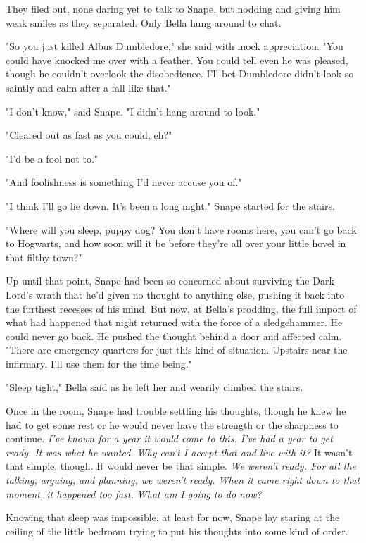 They filed out, none daring yet to talk to Snape, but nodding and giving him weak smiles as they separated. Only Bella hung around to chat.

"So you just killed Albus Dumbledore," she said with mock appreciation. "You could have knocked me over with a feather. You could tell even he was pleased, though he couldn't overlook the disobedience. I'll bet Dumbledore didn't look so saintly and calm after a fall like that."

"I don't know," said Snape. "I didn't hang around to look."

"Cleared out as fast as you could, eh?"

"I'd be a fool not to."

"And foolishness is something I'd never accuse you of."

"I think I'll go lie down. It's been a long night." Snape started for the stairs.

"Where will you sleep, puppy dog? You don't have rooms here, you can't go back to Hogwarts, and how soon will it be before they're all over your little hovel in that filthy town?"

Up until that point, Snape had been so concerned about surviving the Dark Lord's wrath that he'd given no thought to anything else, pushing it back into the furthest recesses of his mind. But now, at Bella's prodding, the full import of what had happened that night returned with the force of a sledgehammer. He could never go back. He pushed the thought behind a door and affected calm. "There are emergency quarters for just this kind of situation. Upstairs near the infirmary. I'll use them for the time being."

"Sleep tight," Bella said as he left her and wearily climbed the stairs.

Once in the room, Snape had trouble settling his thoughts, though he knew he had to get some rest or he would never have the strength or the sharpness to continue. \emph{I've known for a year it would come to this. I've had a year to get ready. It was what he wanted. Why can't I accept that and live with it?} It wasn't that simple, though. It would never be that simple. \emph{We weren't ready. For all the talking, arguing, and planning, we weren't ready. When it came right down to that moment, it happened too fast. What am I going to do now?}

Knowing that sleep was impossible, at least for now, Snape lay staring at the ceiling of the little bedroom trying to put his thoughts into some kind of order.

